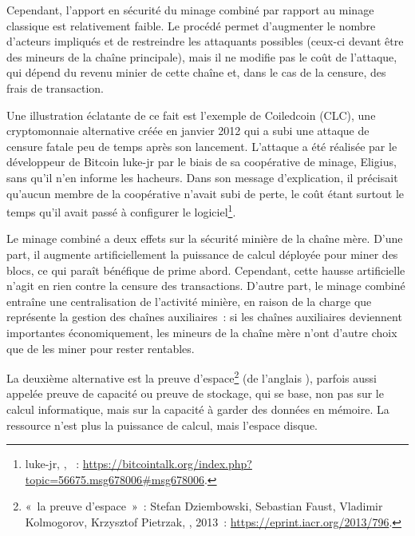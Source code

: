Cependant, l'apport en sécurité du minage combiné par rapport au minage classique est relativement faible. Le procédé permet d'augmenter le nombre d'acteurs impliqués et de restreindre les attaquants possibles (ceux-ci devant être des mineurs de la chaîne principale), mais il ne modifie pas le coût de l'attaque, qui dépend du revenu minier de cette chaîne et, dans le cas de la censure, des frais de transaction.

Une illustration éclatante de ce fait est l'exemple de Coiledcoin (CLC), une cryptomonnaie alternative créée en janvier 2012 qui a subi une attaque de censure fatale peu de temps après son lancement. L'attaque a été réalisée par le développeur de Bitcoin luke-jr par le biais de sa coopérative de minage, Eligius, sans qu'il n'en informe les hacheurs. Dans son message d'explication, il précisait qu'aucun membre de la coopérative n'avait subi de perte, le coût étant surtout le temps qu'il avait passé à configurer le logiciel\footnote{luke-jr, , ~: \url{https://bitcointalk.org/index.php?topic=56675.msg678006\#msg678006}.}.

Le minage combiné a deux effets sur la sécurité minière de la chaîne mère. D'une part, il augmente artificiellement la puissance de calcul déployée pour miner des blocs, ce qui paraît bénéfique de prime abord. Cependant, cette hausse artificielle n'agit en rien contre la censure des transactions. D'autre part, le minage combiné entraîne une centralisation de l'activité minière, en raison de la charge que représente la gestion des chaînes auxiliaires~: si les chaînes auxiliaires deviennent importantes économiquement, les mineurs de la chaîne mère n'ont d'autre choix que de les miner pour rester rentables.



La deuxième alternative est la preuve d'espace\footnote{«~la preuve d'espace~»~: Stefan Dziembowski, Sebastian Faust, Vladimir Kolmogorov, Krzysztof Pietrzak, , 2013~: \url{https://eprint.iacr.org/2013/796}.} (de l'anglais ), parfois aussi appelée preuve de capacité ou preuve de stockage, qui se base, non pas sur le calcul informatique, mais sur la capacité à garder des données en mémoire. La ressource n'est plus la puissance de calcul, mais l'espace disque.

